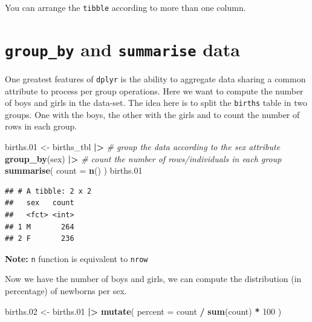 \documentclass[
]{book}
\newenvironment{Shaded}{\begin{snugshade}}{\end{snugshade}}
\newcommand{\AttributeTok}[1]{\textcolor[rgb]{0.13,0.29,0.53}{#1}}
\newcommand{\CommentTok}[1]{\textcolor[rgb]{0.56,0.35,0.01}{\textit{#1}}}
\newcommand{\DecValTok}[1]{\textcolor[rgb]{0.00,0.00,0.81}{#1}}
\newcommand{\FloatTok}[1]{\textcolor[rgb]{0.00,0.00,0.81}{#1}}
\newcommand{\FunctionTok}[1]{\textcolor[rgb]{0.13,0.29,0.53}{\textbf{#1}}}
\newcommand{\NormalTok}[1]{#1}
\newcommand{\OtherTok}[1]{\textcolor[rgb]{0.56,0.35,0.01}{#1}}
\newcommand{\SpecialCharTok}[1]{\textcolor[rgb]{0.81,0.36,0.00}{\textbf{#1}}}
\theoremstyle{definition}
\theoremstyle{definition}
\theoremstyle{definition}
\theoremstyle{definition}
\theoremstyle{remark}
\begin{document}
You can arrange the \texttt{tibble} according to more than one column.

\section{\texorpdfstring{\texttt{group\_by} and \texttt{summarise} data}{group\_by and summarise data}}\label{group_by-and-summarise-data}

One greatest features of \texttt{dplyr} is the ability to aggregate data sharing a common attribute to process per group operations.
Here we want to compute the number of boys and girls in the data-set.
The idea here is to split the \texttt{births} table in two groups. One with the boys, the other with the girls and to count the number of rows in each group.

\begin{Shaded}
\begin{Highlighting}[]
\NormalTok{births}\FloatTok{.01} \OtherTok{\textless{}{-}}
\NormalTok{  births\_tbl }\SpecialCharTok{|\textgreater{}}
  \CommentTok{\# group the data according to the sex attribute}
  \FunctionTok{group\_by}\NormalTok{(sex) }\SpecialCharTok{|\textgreater{}}
  \CommentTok{\# count the number of rows/individuals in each group}
  \FunctionTok{summarise}\NormalTok{(}
    \AttributeTok{count =} \FunctionTok{n}\NormalTok{()}
\NormalTok{  )}
\NormalTok{births}\FloatTok{.01}
\end{Highlighting}
\end{Shaded}

\begin{verbatim}
## # A tibble: 2 x 2
##   sex   count
##   <fct> <int>
## 1 M       264
## 2 F       236
\end{verbatim}

\textbf{Note:} \texttt{n} function is equivalent to \texttt{nrow}

Now we have the number of boys and girls, we can compute the distribution (in percentage) of newborns per sex.

\begin{Shaded}
\begin{Highlighting}[]
\NormalTok{births}\FloatTok{.02} \OtherTok{\textless{}{-}}
\NormalTok{  births}\FloatTok{.01} \SpecialCharTok{|\textgreater{}}
  \FunctionTok{mutate}\NormalTok{(}
    \AttributeTok{percent =}\NormalTok{ count }\SpecialCharTok{/} \FunctionTok{sum}\NormalTok{(count) }\SpecialCharTok{*} \DecValTok{100}
\NormalTok{  )}
\end{Highlighting}
\end{Shaded}
\end{document}
